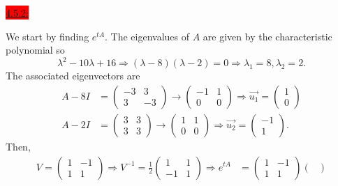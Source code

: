 \documentclass{exam}
\begin{document}
\colorbox{red}{\underline{4.5.2:}}
\begin{solution}
    We start by finding $e^{tA}$. The eigenvalues of $A$ are given by the characteristic polynomial so 
    \[
        \lambda^2 - 10\lambda + 16 \Rightarrow (\lambda -8)(\lambda - 2) = 0 \Rightarrow \lambda_1 = 8, \lambda_2 = 2.
    \]
    The associated eigenvectors are 
    \begin{align*}
        A - 8I &= \begin{pmatrix}
            -3 & 3 \\
            3 & -3
        \end{pmatrix}
        \to \begin{pmatrix}
            -1 & 1 \\
            0 & 0
        \end{pmatrix}
        \Rightarrow \vec{u_1} = \begin{pmatrix}
            1 \\ 0
        \end{pmatrix} \\
        A - 2I &= \begin{pmatrix}
            3 & 3 \\
            3 & 3
        \end{pmatrix}
        \to \begin{pmatrix}
            1 & 1 \\ 
            0 & 0 
        \end{pmatrix}
        \Rightarrow \vec{u_2} = \begin{pmatrix}
            -1 \\ 1
        \end{pmatrix}.
    \end{align*}
    Then, 
    \begin{align*}
        V = \begin{pmatrix}
            1 & -1 \\
            1 & 1
        \end{pmatrix} 
        \Rightarrow V^{-1} = \frac{1}{2}\begin{pmatrix}
            1 & 1 \\
            -1 & 1
        \end{pmatrix}
        \Rightarrow e^{tA} &= \begin{pmatrix}
            1 & -1 \\
            1 & 1 
        \end{pmatrix}
        \begin{pmatrix}

\end{pmatrix}
\end{align*}
\end{solution}
\end{document}
